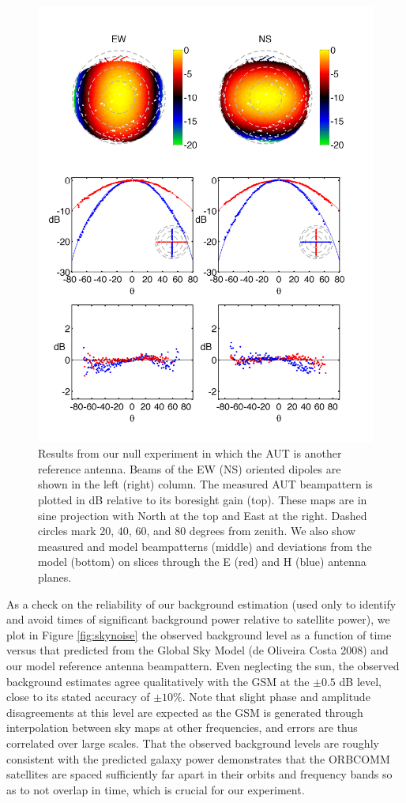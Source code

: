 \begin{figure}
\includegraphics[width=5in]{chap1_precision_beammapping_figures/null2_abs.pdf}
\caption[Results from our null experiment.]{Results from our null experiment in which the AUT is another reference antenna. Beams of the EW (NS) oriented dipoles are shown in the left (right) column. The measured AUT beampattern is plotted in dB relative to its boresight gain (top). These maps are in sine projection with North at the top and East at the right. Dashed circles mark 20, 40, 60, and 80 degrees from zenith. We also show measured and model beampatterns (middle) and deviations from the model (bottom) on slices through the E (red) and H (blue) antenna planes.}
\label{fig:null2map}
\end{figure}


As a check on the reliability of our background estimation (used only to identify and avoid times of significant background power relative to satellite power), we plot in Figure \ref{fig:skynoise} the observed background level as a function of time versus that predicted from the Global Sky Model (de Oliveira Costa 2008) and our model reference antenna beampattern. Even neglecting the sun, the observed background estimates agree qualitatively with the GSM at the $\pm0.5$ dB level, close to its stated accuracy of $\pm10\%$. Note that slight phase and amplitude disagreements at this level are expected as the GSM is generated through interpolation between sky maps at other frequencies, and errors are thus correlated over large scales. That the observed background levels are  roughly consistent with the predicted galaxy power demonstrates that the ORBCOMM satellites are spaced sufficiently far apart in their orbits and frequency bands so as to not overlap in time, which is crucial for our experiment.

